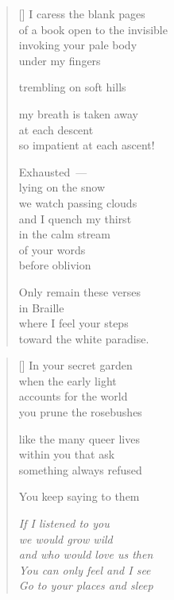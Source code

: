 \documentclass[14pt]{extbook}
\newcommand*{\centeredornament}{\centerline{\pgfornament[width=6cm]{88}}}
\begin{document}
\begin{verse}[\versewidth]
  I caress the blank pages \\
  of a book open to the invisible \\
  invoking your pale body \\
  under my fingers

  trembling on soft hills

  my breath is taken away \\
  at each descent \\
  so impatient at each ascent!

  Exhausted~--- \\
  lying on the snow \\
  we watch passing clouds \\
  and I quench my thirst \\
  in the calm stream \\
  of your words \\
  before oblivion

  Only remain these verses \\
  in Braille \\
  where I feel your steps \\
  toward the white paradise.
\end{verse}


\newpage

\vspace*{-15mm}
\centeredornament
\vspace*{-7mm}


\settowidth{\versewidth}{and who would love us then}

\begin{verse}[\versewidth]
  In your secret garden \\
  when the early light \\
  accounts for the world \\
  you prune the rosebushes

  like the many queer lives \\
  within you that ask \\
  something always refused

  You keep saying to them

  \emph{If I listened to you \\
  we would grow wild \\
  and who would love us then \\
  You can only feel and I see \\
  Go to your places and sleep}
\end{verse}
\end{document}
